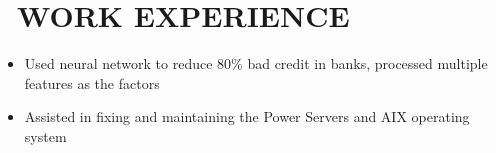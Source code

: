 \documentclass{resume}
\begin{document}


\section{\faInfo\ WORK EXPERIENCE}
\begin{itemize}[parsep=0.5ex]
  \item Used neural network to reduce 80\% bad credit in banks, processed multiple features as the factors
  \item Assisted in fixing and maintaining the Power Servers and AIX operating system
\end{itemize}

%
%
\end{document}
